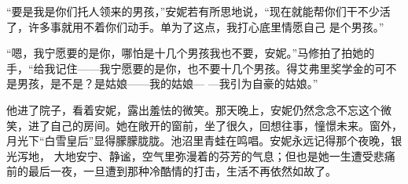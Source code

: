 \documentclass{article}
\begin{document}
“要是我是你们托人领来的男孩，”安妮若有所思地说，“现在就能帮你们干不少活了，许多事就用不着你们动手。单为了这点，我打心底里情愿自己
是个男孩。” 

“嗯，我宁愿要的是你，哪怕是十几个男孩我也不要，安妮。”马修拍了拍她的手，“给我记住——我宁愿要的是你，也不要十几个男孩。得艾弗里奖学金的可不是男孩，是不是？是姑娘——我的姑娘—
—我引为自豪的姑娘。” 

他进了院子，看着安妮，露出羞怯的微笑。那天晚上，安妮仍然念念不忘这个微笑，进了自己的房间。她在敞开的窗前，坐了很久，回想往事，憧憬未来。窗外，月光下“白雪皇后”显得朦朦胧胧。池沼里青蛙在鸣唱。安妮永远记得那个夜晚，银光泻地，
\newpage
大地安宁、静谧，空气里弥漫着的芬芳的气息；但也是她一生遭受悲痛前的最后一夜，一旦遭到那种冷酷情的打击，生活不再依然如故了。
\end{document}
